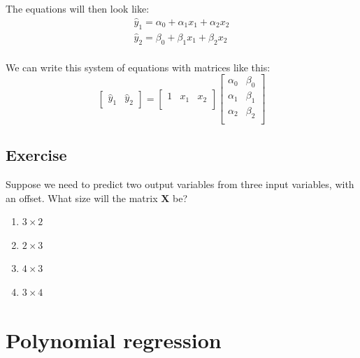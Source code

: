 \documentclass[11pt]{article}
\newcommand\xmtx{\boldsymbol{X}}
\newcommand\yhat{\hat{y}}
\begin{document}
The equations will then look like:
\begin{equation}
    \begin{array}{l}
    \yhat_1 = \alpha_0 + \alpha_1 x_1  + \alpha_2 x_2 \\
    \yhat_2 = \beta_0 + \beta_1 x_1  + \beta_2 x_2 \\
    \end{array}
\end{equation}

We can write this system of equations with matrices like this:
\begin{equation}
    \begin{bmatrix}
        \yhat_1 & \yhat_2
    \end{bmatrix} = 
    \begin{bmatrix}
        1 & x_1 & x_2 \\
    \end{bmatrix}
    \begin{bmatrix}
        \alpha_0 & \beta_0 \\
        \alpha_1 & \beta_1 \\
        \alpha_2 & \beta_2 \\
    \end{bmatrix}
\end{equation}




\subsection{ Exercise }

Suppose we need to predict two output variables from three input
variables, with an offset.  What size will the matrix $\xmtx$ be?
\begin{enumerate}
    \item $3 \times 2$
    \item $2 \times 3$
    \item $4 \times 3$
    \item $3 \times 4$
\end{enumerate}


\section{ Polynomial regression }
\end{document}
